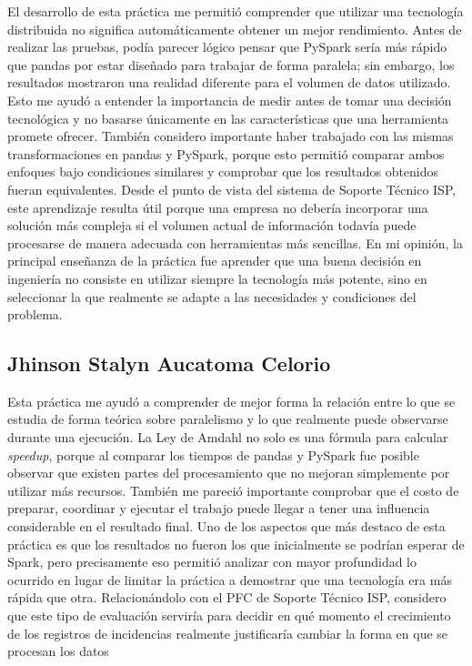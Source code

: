 \documentclass[11pt,a4paper]{article}
\begin{document}
    El desarrollo de esta práctica me permitió comprender que utilizar una tecnología distribuida no significa
    automáticamente obtener un mejor rendimiento. Antes de realizar las pruebas, podía parecer lógico pensar que
    PySpark sería más rápido que pandas por estar diseñado para trabajar de forma paralela; sin embargo, los
    resultados mostraron una realidad diferente para el volumen de datos utilizado. Esto me ayudó a entender la
    importancia de medir antes de tomar una decisión tecnológica y no basarse únicamente en las características
    que una herramienta promete ofrecer. También considero importante haber trabajado con las mismas
    transformaciones en pandas y PySpark, porque esto permitió comparar ambos enfoques bajo condiciones
    similares y comprobar que los resultados obtenidos fueran equivalentes. Desde el punto de vista del sistema
    de Soporte Técnico ISP, este aprendizaje resulta útil porque una empresa no debería incorporar una solución más
    compleja si el volumen actual de información todavía puede procesarse de manera adecuada con herramientas más
    sencillas. En mi opinión, la principal enseñanza de la práctica fue aprender que una buena decisión en ingeniería
    no consiste en utilizar siempre la tecnología más potente, sino en seleccionar la que realmente se adapte a las
    necesidades y condiciones del problema.


    \subsection*{Jhinson Stalyn Aucatoma Celorio}


    Esta
    práctica me ayudó a comprender de mejor forma la relación entre lo que se
    estudia de forma teórica sobre paralelismo y lo que realmente puede observarse
    durante una ejecución. La Ley de Amdahl no solo es una fórmula para calcular
    \emph{speedup}, porque al comparar los tiempos de pandas y PySpark fue posible
    observar que existen partes del procesamiento que no mejoran simplemente por
    utilizar más recursos. También me pareció importante comprobar que el costo de
    preparar, coordinar y ejecutar el trabajo puede llegar a tener una influencia
    considerable en el resultado final. Uno de los aspectos que más destaco de esta
    práctica es que los resultados no fueron los que inicialmente se podrían
    esperar de Spark, pero precisamente eso permitió analizar con mayor profundidad
    lo ocurrido en lugar de limitar la práctica a demostrar que una tecnología era
    más rápida que otra. Relacionándolo con el PFC de Soporte Técnico ISP,
    considero que este tipo de evaluación serviría para decidir en qué momento el
    crecimiento de los registros de incidencias realmente justificaría cambiar la
    forma en que se procesan los datos
\end{document}
